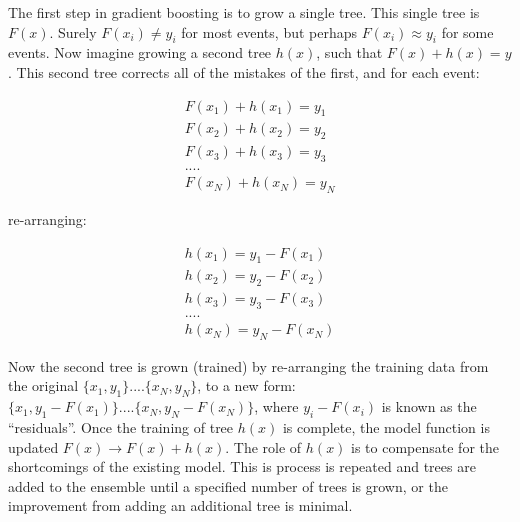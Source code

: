 The first step in gradient boosting is to grow a single tree. This single tree is $F(x)$. Surely $F(x_{i}) \neq y_{i}$ for most events, but perhaps $F(x_{i}) \approx y_{i}$
for some events. Now imagine growing a second tree $h(x)$, such that $F(x) + h(x) = y$. This second tree corrects all of the mistakes of the first, and for each event:

\begin{equation}
\begin{aligned}
\label{eqn:residual1}
F(x_{1}) + h(x_{1}) = y_{1} \\ F(x_{2}) + h(x_{2}) = y_{2} \\ F(x_{3}) + h(x_{3}) = y_{3} \\ .... \\ F(x_{N}) + h(x_{N}) = y_{N}
\end{aligned} 
\end{equation}

\noindent re-arranging:

\begin{equation}
\begin{aligned}
\label{eqn:residual2}
h(x_{1}) = y_{1} - F(x_{1}) \\ h(x_{2}) = y_{2} - F(x_{2}) \\ h(x_{3}) = y_{3} - F(x_{3}) \\ .... \\ h(x_{N}) = y_{N} - F(x_{N})
\end{aligned} 
\end{equation}

\noindent Now the second tree is grown (trained) by re-arranging the training data from the original $\{x_1,y_{1}\}....\{x_N,y_{N}\}$, to a new form:
$\{x_1,y_{1} - F(x_{1})\}....\{x_N,y_{N} - F(x_{N})\}$, where $y_{i} - F(x_{i})$ is known as the ``residuals''. Once the training of tree $h(x)$ is complete,
the model function is updated $F(x) \rightarrow F(x) + h(x)$. The role of $h(x)$ is to compensate for the shortcomings of the existing model.
This is process is repeated and trees are added to the ensemble until a specified number of trees is grown, or the improvement
from adding an additional tree is minimal. 

